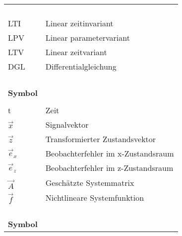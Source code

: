 %
%
\begin{supertabular*}{\textwidth}{ll}
 \\
\\
\hline 
{\bfseries {}}				&		{\bfseries {}} \\
\hline
\\
LTI				&	Linear zeitinvariant\\
LPV				&	Linear parametervariant\\
LTV				&	Linear zeitvariant\\
DGL				&	Differentialgleichung\\
\\
\\
 \\
\\
\hline 
{\bfseries Symbol}					&		{\bfseries {}} \\
\hline
\\
t            				& 	Zeit \\
$\vec x$	 			& 	Signalvektor \\
$\vec z$				&	Transformierter Zustandsvektor\\
$\vec e_x$				&	Beobachterfehler im x-Zustandsraum\\
$\vec e_z$				&	Beobachterfehler im z-Zustandsraum\\
$\hat{\vec A}$			&	Gesch\"atzte Systemmatrix\\
$\vec f$				&	Nichtlineare Systemfunktion\\
\\
\\
 \\
\\
\hline 
{\bfseries Symbol}					&		{\bfseries {}} \\

\end{supertabular*}
